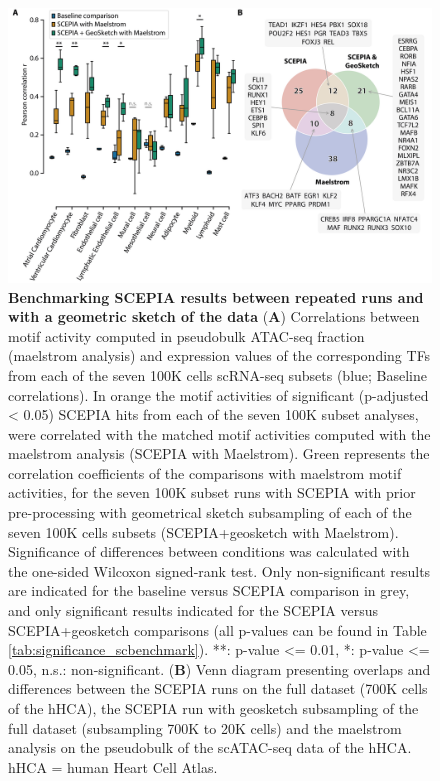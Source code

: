 \begin{figure}
    \centering
    \includegraphics[width=0.75\linewidth]{ch.scepia/imgs/OverlappingHitsBetweenSCEPIAGEOANDMAELSTROM_BlackMyriad_onlySign_baselineNS_v11_Figure4.png}
    \caption{\textbf{Benchmarking SCEPIA results between repeated runs and with a geometric sketch of the data} (\textbf{A}) Correlations between motif activity computed in pseudobulk ATAC-seq fraction (maelstrom analysis) and expression values of the corresponding TFs from each of the seven 100K cells scRNA-seq subsets (blue; Baseline correlations). In orange the motif activities of significant (p-adjusted < 0.05) SCEPIA hits from each of the seven 100K subset analyses, were correlated with the matched motif activities computed with the maelstrom analysis (SCEPIA with Maelstrom). Green represents the correlation coefficients of the comparisons with maelstrom motif activities, for the seven 100K subset runs with SCEPIA with prior pre-processing with geometrical sketch subsampling of each of the seven 100K cells subsets (SCEPIA+geosketch with Maelstrom). Significance of differences between conditions was calculated with the one-sided Wilcoxon signed-rank test. Only non-significant results are indicated for the baseline versus SCEPIA comparison in grey, and only significant results indicated for the SCEPIA versus SCEPIA+geosketch comparisons (all p-values can be found in Table \ref{tab:significance_scbenchmark}).  **: p-value <= 0.01, *: p-value <= 0.05, n.s.: non-significant. (\textbf{B}) Venn diagram presenting overlaps and differences between the SCEPIA runs on the full dataset (700K cells of the hHCA), the SCEPIA run with geosketch subsampling of the full dataset (subsampling 700K to 20K cells) and the maelstrom analysis on the pseudobulk of the scATAC-seq data of the hHCA. hHCA = human Heart Cell Atlas.}
    \label{fig:sc_benchmark}
\end{figure}

